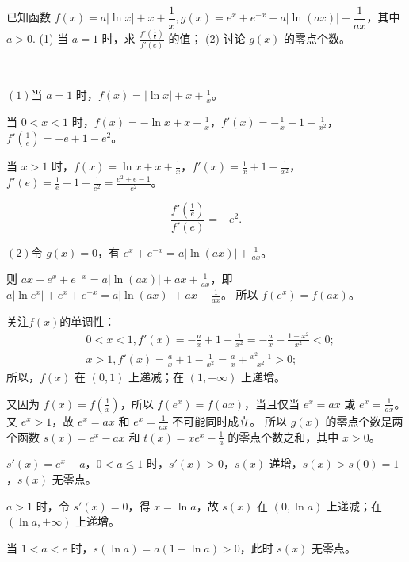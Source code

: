 \begin{example}[2022年武汉二调]
    已知函数 $f(x) = a|\ln x| + x + \dfrac{1}{x}, g(x) = e^x + e^{-x} - a|\ln(ax)| - \dfrac{1}{ax}$，其中 $a > 0$.
        (1) 当 $a = 1$ 时，求 $\frac{f'\left(\frac{1}{e}\right)}{f'(e)}$ 的值；
        (2) 讨论 $g(x)$ 的零点个数。
\end{example}
\begin{jie}
\ 

$(1)$当 $a=1$ 时，$f(x) = |\ln x| + x + \frac{1}{x}$。

当 $0 < x < 1$ 时，$f(x) = -\ln x + x + \frac{1}{x}$，$f'(x) = -\frac{1}{x} + 1 - \frac{1}{x^2}$，$f'\left(\frac{1}{e}\right) = -e + 1 - e^2$。

当 $x > 1$ 时，$f(x) = \ln x + x + \frac{1}{x}$，$f'(x) = \frac{1}{x} + 1 - \frac{1}{x^2}$，$f'(e) = \frac{1}{e} + 1 - \frac{1}{e^2} = \frac{e^2 + e - 1}{e^2}$。

\[
\frac{f'\left(\frac{1}{e}\right)}{f'(e)} = -e^2.
\]


$(2) $令 $g(x) = 0$，有 $e^x + e^{-x} = a|\ln(ax)| + \frac{1}{ax}$。
    
则 $ax + e^x + e^{-x} = a|\ln(ax)| + ax + \frac{1}{ax}$，即 $a|\ln e^x| + e^x + e^{-x} = a|\ln(ax)| + ax + \frac{1}{ax}$。
所以 $f(e^x) = f(ax)$。

关注\(f(x)\)的单调性：
    \[
    \begin{aligned}
        &0 < x < 1 , f'(x) = -\frac{a}{x} + 1 - \frac{1}{x^2} = -\frac{a}{x} - \frac{1-x^2}{x^2} < 0; \\
        &x > 1 ,f'(x) = \frac{a}{x} + 1 - \frac{1}{x^2} = \frac{a}{x} + \frac{x^2-1}{x^2} > 0;
    \end{aligned}
    \]
所以，$f(x)$ 在 $(0,1)$ 上递减；在 $(1,+\infty)$ 上递增。
    
    又因为 $f(x) = f\left(\frac{1}{x}\right)$，所以 $f(e^x) = f(ax)$，当且仅当 $e^x = ax$ 或 $e^x = \frac{1}{ax}$。
    又 $e^x > 1$，故 $e^x = ax$ 和 $e^x = \frac{1}{ax}$ 不可能同时成立。
    所以 $g(x)$ 的零点个数是两个函数 $s(x) = e^x - ax$ 和 $t(x) = xe^x - \frac{1}{a}$ 的零点个数之和，其中 $x > 0$。
    
    $s'(x) = e^x - a$，$0 < a \leq 1$ 时，$s'(x) > 0$，$s(x)$ 递增，$s(x) > s(0) = 1$，$s(x)$ 无零点。
    
    $a > 1$ 时，令 $s'(x) = 0$，得 $x = \ln a$，故 $s(x)$ 在 $(0, \ln a)$ 上递减；在 $(\ln a, +\infty)$ 上递增。
    
    当 $1 < a < e$ 时，$s(\ln a) = a(1 - \ln a) > 0$，此时 $s(x)$ 无零点。
    

\end{jie}
